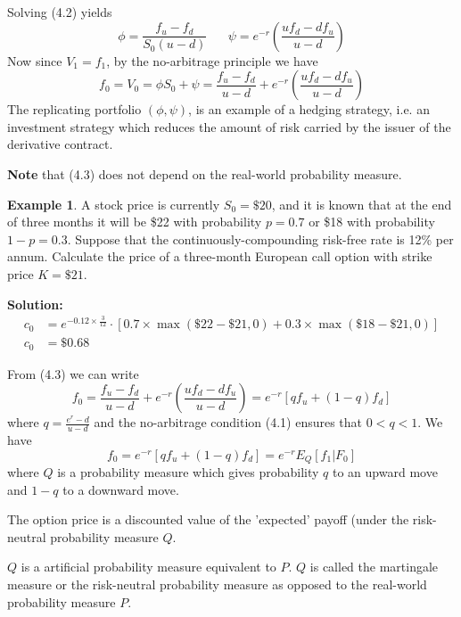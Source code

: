 \documentclass[11pt,a4paper]{book}
\theoremstyle{definition}\newtheorem{definition}{Definition}
\theoremstyle{definition}\newtheorem{fact}{Fact}
\theoremstyle{definition}\newtheorem{remark}{Remark}
\theoremstyle{definition}\newtheorem{ex}{Ex.}
\theoremstyle{definition}\newtheorem{project}{Project}
\theoremstyle{definition}\newtheorem{problem}{Problem}
\theoremstyle{definition}\newtheorem{example}{Example}
\numberwithin{theorem}{section}
\numberwithin{corollary}{chapter}
\numberwithin{assumption}{chapter}
\numberwithin{definition}{chapter}
\numberwithin{prop}{chapter}
\numberwithin{notation}{chapter}
\numberwithin{problem}{chapter}
\numberwithin{example}{chapter}
\numberwithin{fact}{chapter}
\numberwithin{ex}{chapter}
\begin{document}
Solving (4.2) yields
$$ \phi = \frac{f_u - f_d}{S_0(u-d)} \,\,\,\,\,\,\,\,\,\, \psi = e^{-r}\left(\frac{uf_d - df_u}{u-d}\right) $$
Now since $V_1 = f_1$, by the no-arbitrage principle we have
\begin{equation}
f_0 = V_0 = \phi S_0 + \psi = \frac{f_u - f_d}{u-d} + e^{-r} \left(\frac{uf_d - df_u}{u-d} \right)
\end{equation}
The replicating portfolio $(\phi,\psi)$, is an example of a hedging strategy, i.e. an investment strategy which reduces the amount of risk carried by the issuer of the derivative contract.

\textbf{Note} that (4.3) does not depend on the real-world probability measure.

\begin{example}
A stock price is currently $S_0 = \$20$, and it is known that at the end of three months it will be \$22 with probability $p=0.7$ or \$18 with probability $1-p=0.3$. Suppose that the continuously-compounding risk-free rate is 12\% per annum. Calculate the price of a three-month European call option with strike price $K=\$21$.

\vspace{15pt}
\textbf{Solution:}
\begin{align*}
c_0 &= e^{-0.12\times \frac{3}{12}} \cdot [0.7 \times \max(\$22 - \$21, 0) + 0.3 \times \max(\$18 - \$21, 0)] \\
c_0 &= \$0.68
\end{align*}

\end{example}

\vspace{20pt}
From (4.3) we can write 
$$ f_0 = \frac{f_u - f_d}{u-d} + e^{-r} \left(\frac{uf_d - df_u}{u-d} \right)= e^{-r}[qf_u + (1-q)f_d] $$
where $q = \frac{e^r-d}{u-d}$ and the no-arbitrage condition (4.1) ensures that $0<q<1$. We have
\begin{equation}
f_0 = e^{-r} [qf_u + (1-q)f_d] = e^{-r}E_Q[f_1|F_0]
\end{equation}
where $Q$ is a probability measure which gives probability $q$ to an upward move and $1-q$ to a downward move.

The option price is a discounted value of the 'expected' payoff (under the risk-neutral probability measure $Q$.


$Q$ is a artificial probability measure equivalent to $P$. $Q$ is called the martingale measure or the risk-neutral probability measure as opposed to the real-world probability measure $P$.
\end{document}
